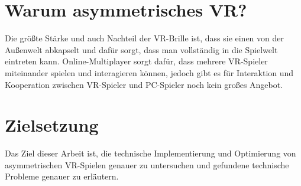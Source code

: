 \section{Warum asymmetrisches VR?}
Die größte Stärke und auch Nachteil der VR-Brille ist, dass sie einen von der Außenwelt abkapselt und dafür sorgt, dass man vollständig in die Spielwelt eintreten kann. Online-Multiplayer sorgt dafür, dass mehrere VR-Spieler miteinander spielen und interagieren können, jedoch gibt es für Interaktion und Kooperation zwischen VR-Spieler und PC-Spieler noch kein großes Angebot.

\section{Zielsetzung}
Das Ziel dieser Arbeit ist, die technische Implementierung und Optimierung von asymmetrischen VR-Spielen genauer zu untersuchen und gefundene technische Probleme genauer zu erläutern.

